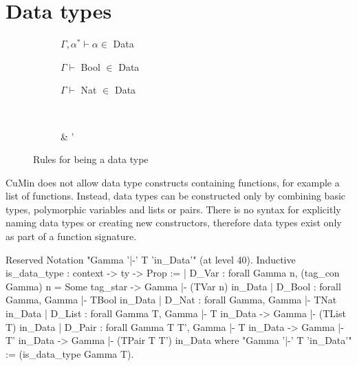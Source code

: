 \documentclass[paper = a4, fleqn, twoside]{scrreprt}
\begin{document}
\section{Data types}
\begin{figure}[H]
	\begin{center}
		\begin{subfigure}{.25 \linewidth}
			\centering
			$\Gamma, \alpha^{*} \vdash \alpha \in$ Data
		\end{subfigure}
		\begin{subfigure}{.25 \linewidth}
			\centering
			$\Gamma \vdash$ Bool $\in$ Data
		\end{subfigure}
		\begin{subfigure}{.25 \linewidth}
			\centering
			$\Gamma \vdash$ Nat $\in$ Data
		\end{subfigure}\\
		\vspace{1em}
		\begin{subfigure}{.375 \linewidth}
			\centering
			      {\Gamma \vdash \tau \in {}}
		\end{subfigure}
		\hspace{.1 \linewidth}
		\begin{subfigure}{.375 \linewidth}
			\centering
			      {\Gamma \vdash \tau \in {} & \Gamma \vdash \tau' \in {}}
		\end{subfigure}
	\end{center}
	\caption{Rules for being a data type}
\end{figure}
CuMin does not allow data type constructs containing functions, for example a list of functions. Instead, data types can be constructed only by combining basic types, polymorphic variables and lists or pairs. There is no syntax for explicitly naming data types or creating new constructors, therefore data types exist only as part of a function signature.
\begin{coqcode}
Reserved Notation "Gamma '|-' T 'in_Data'" (at level 40).
Inductive is_data_type : context -> ty -> Prop :=
  | D_Var  : forall Gamma n,
               (tag_con Gamma) n  = Some tag_star ->
               Gamma |- (TVar n) in_Data
  | D_Bool : forall Gamma, Gamma |- TBool in_Data
  | D_Nat  : forall Gamma, Gamma |- TNat in_Data
  | D_List : forall Gamma T,
               Gamma |- T in_Data ->
               Gamma |- (TList T) in_Data
  | D_Pair : forall Gamma T T', 
               Gamma |- T in_Data ->
               Gamma |- T' in_Data ->
               Gamma |- (TPair T T') in_Data
where "Gamma '|-' T 'in_Data'" := (is_data_type Gamma T).
\end{coqcode}
\end{document}

